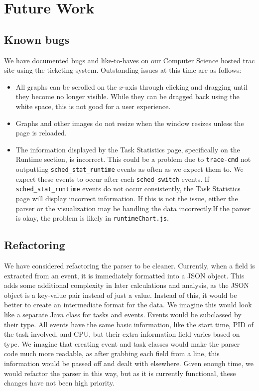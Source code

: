 \documentclass{hmcclinic}
\begin{document}
\chapter{Future Work}
\section{Known bugs}

  We have documented bugs and like-to-haves on our Computer Science hosted trac
  site using the ticketing system. Outstanding issues at this time are as
  follows:

  \begin{itemize}
  
  \item All graphs can be scrolled on the $x$-axis through clicking and dragging until they become no longer visible. While
    they can be dragged back using the white space, this is not good for a user
    experience.

  \item Graphs and other images do not resize when the window resizes unless the
    page is reloaded.

  \item The information displayed by the Task Statistics page, specifically on
    the Runtime section, is incorrect. This could be a problem due to
    \texttt{trace-cmd} not outputting \texttt{sched\_stat\_runtime} events as often
    as we expect them to. We expect these events to occur after each
    \texttt{sched\_switch} events. If \texttt{sched\_stat\_runtime} events do
    not occur consistently, the Task Statistics page will display incorrect
    information. If this is not the issue, either the parser
    or the visualization may be handling the data incorrectly.If the parser is
    okay, the problem is likely in \texttt{runtimeChart.js}.

\end{itemize}


  \section{Refactoring}

  We have considered refactoring the parser to be cleaner. Currently, when a
  field is extracted from an event, it is immediately formatted into a JSON
  object.  This adds some additional complexity in later calculations and
  analysis, as the JSON object is a key-value pair instead of just a value.
  Instead of this, it would be better to create an intermediate format for the
  data. We imagine this would look like a separate Java class for tasks and
  events. Events would be subclassed by their type. All events have the same
  basic information, like the start time, PID of the task involved, and CPU, but
  their extra information field varies based on type. We imagine that creating
  event and task classes would make the parser code much more readable, as after
  grabbing each field from a line, this information would be passed off and
  dealt with elsewhere. Given enough time, we would refactor the parser in this
  way, but as it is currently functional, these changes have not been high
  priority.
\end{document}
